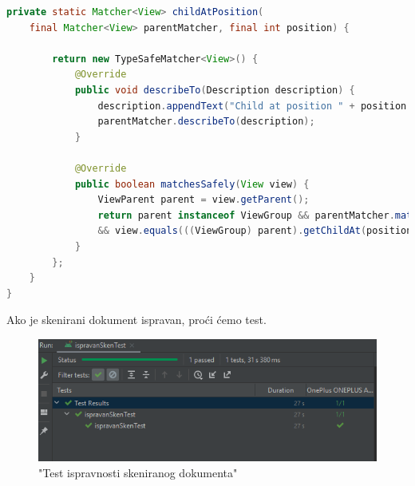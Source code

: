\begin{lstlisting}[language=Java]
	private static Matcher<View> childAtPosition(
	final Matcher<View> parentMatcher, final int position) {
		
		return new TypeSafeMatcher<View>() {
			@Override
			public void describeTo(Description description) {
				description.appendText("Child at position " + position + " in parent ");
				parentMatcher.describeTo(description);
			}
			
			@Override
			public boolean matchesSafely(View view) {
				ViewParent parent = view.getParent();
				return parent instanceof ViewGroup && parentMatcher.matches(parent)
				&& view.equals(((ViewGroup) parent).getChildAt(position));
			}
		};
	}
}

\end{lstlisting}

Ako je skenirani dokument ispravan, proći ćemo test.

\begin{figure}[H]
	\centering
	\includegraphics[scale=1]{./slike/test3.png}
	\caption{"Test ispravnosti skeniranog dokumenta"}
	\label{fig:test3}
\end{figure}\eject


